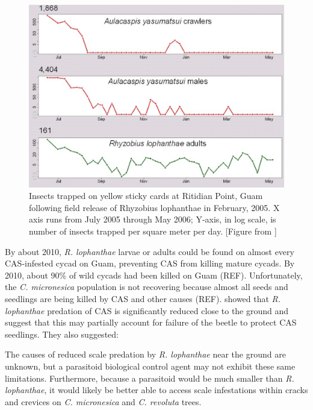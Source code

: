 \documentclass[12pt,letterpaper,english,bibliography=totocnumbered, abstract=on]{scrartcl}
\begin{document}
\begin{figure}[H]
	\centering
	\includegraphics[width=\linewidth]{sticky-traps1}
	
	\caption{Insects trapped on yellow sticky cards at Ritidian Point, Guam following field release of Rhyzobius lophanthae in February, 2005. X axis runs from July 2005 through May 2006; Y-axis, in log scale, is number of insects trapped per square meter per day. [Figure from \cite{moore_biological_2013-2}]}
	
	\label{fig:sticky-traps}
\end{figure}

By about 2010, \textit{R. lophanthae} larvae or adults could be found on almost every CAS-infested cycad on Guam, preventing CAS from killing mature cycads. By 2010, about 90\% of wild cycads had been killed on Guam (REF). Unfortunately, the \textit{C. micronesica} population is not recovering because almost all seeds and seedlings are being killed by CAS and other causes (REF). \cite{marlerVerticalStratificationPredation2013} showed that \textit{R. lophanthae} predation of CAS is significantly reduced close to the ground and suggest that this may partially account for failure of the beetle to protect CAS seedlings. They also suggested:
\begin{displayquote}
The causes of reduced scale predation by
\textit{R. lophanthae} near the ground are unknown,
but a parasitoid biological control agent may
not exhibit these same limitations. Furthermore, because a parasitoid would be much
smaller than \textit{R. lophanthae}, it would likely be
better able to access scale infestations within
cracks and crevices on \textit{C. micronesica} and
\textit{C. revoluta} trees.
\end{displayquote}
\end{document}
